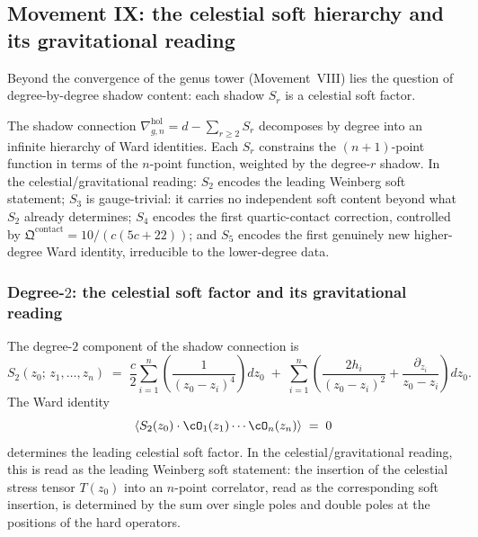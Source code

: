 
\subsection{Movement IX: the celestial soft hierarchy and its gravitational reading}
\label{subsec:gravity-soft-theorems}

Beyond the convergence of the genus tower (Movement~VIII)
lies the question of degree-by-degree shadow content:
each shadow $S_r$ is a celestial soft factor.

The shadow connection
$\nabla^{\mathrm{hol}}_{g,n} = d - \sum_{r \ge 2} S_r$
decomposes by degree into an infinite hierarchy of Ward identities.
Each $S_r$ constrains the
$(n+1)$-point function in terms of the $n$-point function,
weighted by the degree-$r$ shadow. In the celestial/gravitational
reading:
$S_2$ encodes the leading Weinberg soft statement;
$S_3$ is gauge-trivial: it carries no independent soft content
beyond what $S_2$ already determines;
$S_4$ encodes the first quartic-contact correction, controlled by
$\mathfrak{Q}^{\mathrm{contact}} = 10/(c(5c+22))$;
and $S_5$ encodes the first genuinely new higher-degree Ward identity,
irreducible to the lower-degree data.

\subsubsection*{Degree-$2$: the celestial soft factor and its gravitational reading}

\begin{theorem}
\label{thm:gravity-weinberg-soft}
The degree-$2$ component of the shadow connection is
\begin{equation}\label{eq:gravity-S2}
S_2(z_0;\, z_1, \ldots, z_n)
\;=\;
\frac{c}{2}\sum_{i=1}^n
\left(
 \frac{1}{(z_0 - z_i)^4}
\right)
dz_0
\;+\;
\sum_{i=1}^n
\left(
 \frac{2h_i}{(z_0 - z_i)^2}
 + \frac{\partial_{z_i}}{z_0 - z_i}
\right)
dz_0.
\end{equation}
The Ward identity
\[
\left\langle
 S_2(z_0)\cdot
 \cO_1(z_1)\cdots\cO_n(z_n)
\right\rangle
\;=\; 0
\]
determines the leading celestial soft factor. In the
celestial/gravitational reading, this is read as the leading
Weinberg soft statement: the insertion of the celestial stress tensor
$T(z_0)$ into an $n$-point correlator, read as the corresponding soft
insertion, is determined by the sum over single
poles and double poles at the positions of the hard operators.
\end{theorem}

